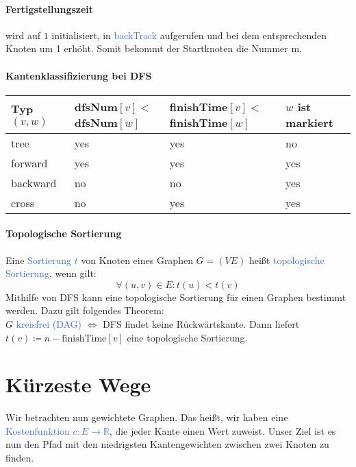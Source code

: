 \documentclass[11pt]{article}
\def \texcol{RoyalBlue}
\begin{document}
\paragraph{Fertigstellungszeit} wird auf $1$ initialisiert, in \textcolor{\texcol}{backTrack} aufgerufen und bei dem entsprechenden Knoten um 1 erhöht. Somit bekommt der Startknoten die Nummer m.

\paragraph{Kantenklassifizierung bei DFS}
\begin{center}
\begin{tabular}{|l||l|l|l|}
Typ $(v,w)$ & dfsNum$[v]<$ dfsNum$[w]$ & finishTime$[v]<$ finishTime$[w]$ & $w$ ist markiert\\
\hline
tree		& yes	& yes	& no\\
forward		& yes	& yes	& yes\\
backward	& no	& no	& yes\\
cross		& no	& yes	& yes\\
\end{tabular}
\end{center}

\paragraph{Topologische Sortierung}Eine \textcolor{\texcol}{Sortierung $t$ }von Knoten eines Graphen $G=(VE)$ heißt \textcolor{\texcol}{topologische Sortierung}, wenn gilt: 
\[\forall(u,v)\in E\colon t(u)<t(v)\] 
Mithilfe von DFS kann eine topologische Sortierung für einen Graphen bestimmt werden. Dazu gilt folgendes Theorem:\\
$G$ \textcolor{\texcol}{kreisfrei (DAG)} $\Longleftrightarrow$ DFS findet keine Rückwärtskante. Dann liefert $t(v)\coloneqq n -\text{finishTime}[v]$ eine topologische Sortierung.

\section{Kürzeste Wege}

Wir betrachten nun gewichtete Graphen. Das heißt, wir haben eine \textcolor{\texcol}{Kostenfunktion $c\colon E \to \mathbb{R}$}, die jeder Kante einen Wert zuweist. Unser Ziel ist es nun den Pfad mit den niedrigsten Kantengewichten zwischen zwei Knoten zu finden.
\end{document}
